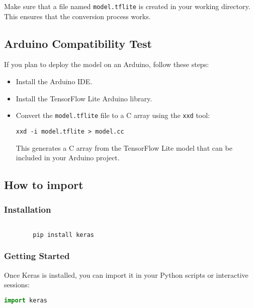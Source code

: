 	Make sure that a file named \texttt{model.tflite} is created in your working directory. This ensures that the conversion process works.
	
	\subsection{Arduino Compatibility Test}
	
	If you plan to deploy the model on an Arduino, follow these steps:
	
	\begin{itemize}
		\item Install the Arduino IDE.
		\item Install the TensorFlow Lite Arduino library.
		\item Convert the \texttt{model.tflite} file to a C array using the \texttt{xxd} tool:
		\begin{lstlisting}[caption={Converting Model to C Array}, label={code:xxd-conversion}, style=bashstyle]
			xxd -i model.tflite > model.cc
		\end{lstlisting}
		This generates a C array from the TensorFlow Lite model that can be included in your Arduino project.
	\end{itemize}
	
	
	\subsection{How to import}
	\subsubsection{Installation}
	
	
	\begin{lstlisting}[language=bash]
		
		pip install keras	
	\end{lstlisting}
	
	\subsubsection{Getting Started}
	Once Keras is installed, you can import it in your Python scripts or interactive sessions:
	
\begin{lstlisting}[language=Python, caption={Example of gesture data with sensor readings}, label={code:gesture-data-json}, style=pythonstyle]
	import keras
\end{lstlisting}
	
